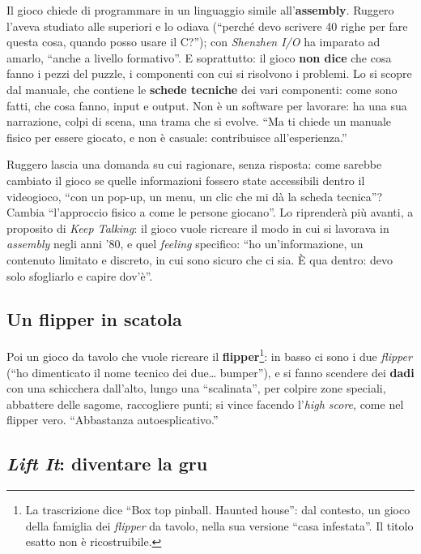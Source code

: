 Il gioco chiede di programmare in un linguaggio simile all'\textbf{assembly}. Ruggero
l'aveva studiato alle superiori e lo odiava (``perché devo scrivere 40 righe per fare
questa cosa, quando posso usare il C?''); con \emph{Shenzhen I/O} ha imparato ad amarlo,
``anche a livello formativo''. E soprattutto: il gioco \textbf{non dice} che cosa fanno
i pezzi del puzzle, i componenti con cui si risolvono i problemi. Lo si scopre dal
manuale, che contiene le \textbf{schede tecniche} dei vari componenti: come sono fatti,
che cosa fanno, input e output. Non è un software per lavorare: ha una sua narrazione,
colpi di scena, una trama che si evolve. ``Ma ti chiede un manuale fisico per essere
giocato, e non è casuale: contribuisce all'esperienza.''

Ruggero lascia una domanda su cui ragionare, senza risposta: come sarebbe cambiato il
gioco se quelle informazioni fossero state accessibili dentro il videogioco, ``con un
pop-up, un menu, un clic che mi dà la scheda tecnica''? Cambia ``l'approccio fisico a
come le persone giocano''. Lo riprenderà più avanti, a proposito di \emph{Keep Talking}:
il gioco vuole ricreare il modo in cui si lavorava in \emph{assembly} negli anni '80, e
quel \emph{feeling} specifico: ``ho un'informazione, un contenuto limitato e discreto, in
cui sono sicuro che ci sia. È qua dentro: devo solo sfogliarlo e capire dov'è''.

\subsection{Un flipper in scatola}



Poi un gioco da tavolo che vuole ricreare il \textbf{flipper}\footnote{La trascrizione
dice ``Box top pinball. Haunted house'': dal contesto, un gioco della famiglia dei
\emph{flipper} da tavolo, nella sua versione ``casa infestata''. Il titolo esatto non è
ricostruibile.}: in basso ci sono i due \emph{flipper} (``ho dimenticato il nome tecnico
dei due\dots{} bumper''), e si fanno scendere dei \textbf{dadi} con una schicchera
dall'alto, lungo una ``scalinata'', per colpire zone speciali, abbattere delle sagome,
raccogliere punti; si vince facendo l'\emph{high score}, come nel flipper vero.
``Abbastanza autoesplicativo.''

\subsection{\emph{Lift It}: diventare la gru}

